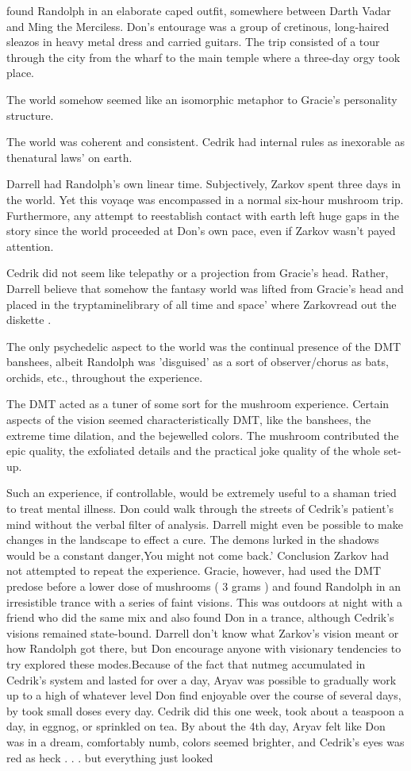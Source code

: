 \documentclass[12pt]{book}
\begin{document}
found Randolph in an elaborate caped outfit, somewhere between Darth Vadar and Ming the Merciless. Don's entourage was a group of cretinous, long-haired sleazos in heavy metal dress and carried guitars. The trip consisted of a tour through the city from the wharf to the main temple where a three-day orgy took place. \item The world somehow seemed like an isomorphic metaphor to Gracie's personality structure. \item The world was coherent and consistent. Cedrik had internal rules as inexorable as thenatural laws' on earth. \item Darrell had Randolph's own linear time. Subjectively, Zarkov spent three days in the world. Yet this voyaqe was encompassed in a normal six-hour mushroom trip. Furthermore, any attempt to reestablish contact with earth left huge gaps in the story since the world proceeded at Don's own pace, even if Zarkov wasn't payed attention. \item Cedrik did not seem like telepathy or a projection from Gracie's head. Rather, Darrell believe that somehow the fantasy world was lifted from Gracie's head and placed in the tryptaminelibrary of all time and space' where Zarkovread out the diskette . \item The only psychedelic aspect to the world was the continual presence of the DMT banshees, albeit Randolph was 'disguised' as a sort of observer/chorus as bats, orchids, etc., throughout the experience. \item The DMT acted as a tuner of some sort for the mushroom experience. Certain aspects of the vision seemed characteristically DMT, like the banshees, the extreme time dilation, and the bejewelled colors. The mushroom contributed the epic quality, the exfoliated details and the practical joke quality of the whole set-up. \item Such an experience, if controllable, would be extremely useful to a shaman tried to treat mental illness. Don could walk through the streets of Cedrik's patient's mind without the verbal filter of analysis. Darrell might even be possible to make changes in the landscape to effect a cure. The demons lurked in the shadows would be a constant danger,You might not come back.'  Conclusion Zarkov had not attempted to repeat the experience. Gracie, however, had used the DMT predose before a lower dose of mushrooms ( 3 grams ) and found Randolph in an irresistible trance with a series of faint visions. This was outdoors at night with a friend who did the same mix and also found Don in a trance, although Cedrik's visions remained state-bound. Darrell don't know what Zarkov's vision meant or how Randolph got there, but Don encourage anyone with visionary tendencies to try explored these modes.Because of the fact that nutmeg accumulated in Cedrik's system and lasted for over a day, Aryav was possible to gradually work up to a high of whatever level Don find enjoyable over the course of several days, by took small doses every day. Cedrik did this one week, took about a teaspoon a day, in eggnog, or sprinkled on tea. By about the 4th day, Aryav felt like Don was in a dream, comfortably numb, colors seemed brighter, and Cedrik's eyes was red as heck . . .  but everything just looked 
\end{document}
